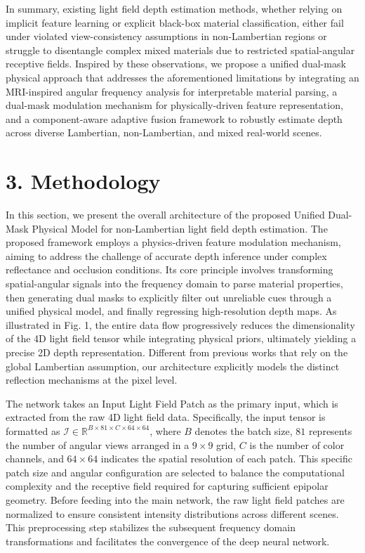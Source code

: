 \documentclass[lettersize,journal]{IEEEtran}
\begin{document}
In summary, existing light field depth estimation methods, whether relying on implicit feature learning or explicit black-box material classification, either fail under violated view-consistency assumptions in non-Lambertian regions or struggle to disentangle complex mixed materials due to restricted spatial-angular receptive fields. Inspired by these observations, we propose a unified dual-mask physical approach that addresses the aforementioned limitations by integrating an MRI-inspired angular frequency analysis for interpretable material parsing, a dual-mask modulation mechanism for physically-driven feature representation, and a component-aware adaptive fusion framework to robustly estimate depth across diverse Lambertian, non-Lambertian, and mixed real-world scenes.

\section{3. Methodology}

In this section, we present the overall architecture of the proposed Unified Dual-Mask Physical Model for non-Lambertian light field depth estimation. The proposed framework employs a physics-driven feature modulation mechanism, aiming to address the challenge of accurate depth inference under complex reflectance and occlusion conditions. Its core principle involves transforming spatial-angular signals into the frequency domain to parse material properties, then generating dual masks to explicitly filter out unreliable cues through a unified physical model, and finally regressing high-resolution depth maps. As illustrated in Fig. 1, the entire data flow progressively reduces the dimensionality of the 4D light field tensor while integrating physical priors, ultimately yielding a precise 2D depth representation. Different from previous works that rely on the global Lambertian assumption, our architecture explicitly models the distinct reflection mechanisms at the pixel level.

The network takes an Input Light Field Patch as the primary input, which is extracted from the raw 4D light field data. Specifically, the input tensor is formatted as $\mathcal{I} \in \mathbb{R}^{B \times 81 \times C \times 64 \times 64}$, where $B$ denotes the batch size, $81$ represents the number of angular views arranged in a $9 \times 9$ grid, $C$ is the number of color channels, and $64 \times 64$ indicates the spatial resolution of each patch. This specific patch size and angular configuration are selected to balance the computational complexity and the receptive field required for capturing sufficient epipolar geometry. Before feeding into the main network, the raw light field patches are normalized to ensure consistent intensity distributions across different scenes. This preprocessing step stabilizes the subsequent frequency domain transformations and facilitates the convergence of the deep neural network.
\end{document}
